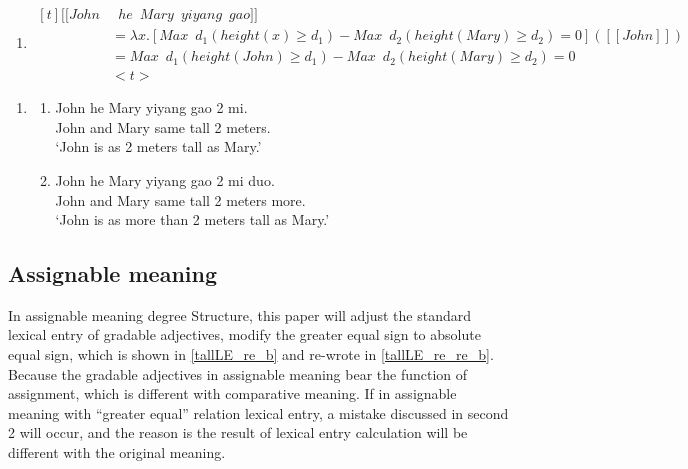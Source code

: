 \documentclass{ctexart}
\begin{document}
\begin{enumerate}
\begin{enumerate}
        \item \label{equality_example_3_d}
        $\begin{aligned}[t]
            [\![John &\enspace he \enspace Mary \enspace yiyang \enspace gao]\!] \\
            &= \lambda x.[Max \enspace d_1 (height(x) \geq d_1) - Max \enspace d_2 (height(Mary) \geq d_2) = 0]([\![John]\!]) \\
            &= Max \enspace d_1 (height(John) \geq d_1) - Max \enspace d_2 (height(Mary) \geq d_2) = 0 \\
            & <t>
        \end{aligned}$
    \end{enumerate}
\end{enumerate}

\begin{enumerate}
    \item \label{equality_example_1}
    \begin{enumerate}
        \item \label{equality_example_1_a}
        John he Mary yiyang gao 2 mi. \\
        John and Mary same tall 2 meters. \\
        `John is as 2 meters tall as Mary.'

        \item \label{equality_example_1_b}
        John he Mary yiyang gao 2 mi duo. \\
        John and Mary same tall 2 meters more. \\
        `John is as more than 2 meters tall as Mary.'
    \end{enumerate}
\end{enumerate}


\subsection{Assignable meaning}

In assignable meaning degree Structure, this paper will adjust the standard lexical entry of gradable adjectives, modify the greater equal sign to absolute equal sign, which is shown in \ref{tallLE_re_b} and re-wrote in \ref{tallLE_re_re_b}. Because the gradable adjectives in assignable meaning bear the function of assignment, which is different with comparative meaning. If in assignable meaning with ``greater equal'' relation lexical entry, a mistake discussed in second 2 will occur, and the reason is the result of lexical entry calculation will be different with the original meaning. 
\end{document}

